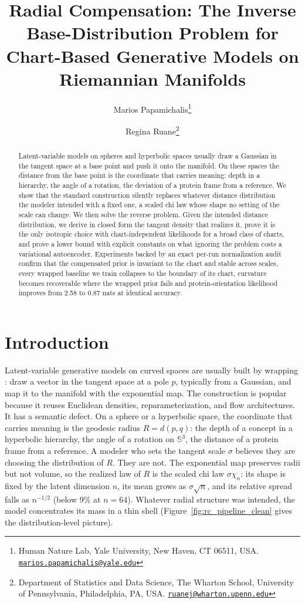 \documentclass{article}
\title{Radial Compensation: The Inverse Base-Distribution Problem for Chart-Based Generative Models on Riemannian Manifolds}
\author{Marios Papamichalis\thanks{\raggedright Human Nature Lab, Yale University, New Haven, CT 06511, USA. \href{mailto:marios.papamichalis@yale.edu}{\nolinkurl{marios.papamichalis@yale.edu}}}
\and Regina Ruane\thanks{\raggedright Department of Statistics and Data Science, The Wharton School, University of Pennsylvania, Philadelphia, PA, USA. \href{mailto:ruanej@wharton.upenn.edu}{\nolinkurl{ruanej@wharton.upenn.edu}}}}
\date{}
\theoremstyle{definition}
\theoremstyle{remark}
\newcommand{\SSS}{\mathbb{S}}
\begin{document}
\maketitle
\begin{abstract}
Latent-variable models on spheres and hyperbolic spaces usually draw a Gaussian in the tangent space at a base point and push it onto the manifold. On these spaces the distance from the base point is the coordinate that carries meaning: depth in a hierarchy, the angle of a rotation, the deviation of a protein frame from a reference. We show that the standard construction silently replaces whatever distance distribution the modeler intended with a fixed one, a scaled chi law whose shape no setting of the scale can change. We then solve the reverse problem. Given the intended distance distribution, we derive in closed form the tangent density that realizes it, prove it is the only isotropic choice with chart-independent likelihoods for a broad class of charts, and prove a lower bound with explicit constants on what ignoring the problem costs a variational autoencoder. Experiments backed by an exact per-run normalization audit confirm that the compensated prior is invariant to the chart and stable across scales, every wrapped baseline we train collapses to the boundary of its chart, curvature becomes recoverable where the wrapped prior fails and protein-orientation likelihood improves from 2.58 to 0.87 nats at identical accuracy.
\end{abstract}

\section{Introduction}
\label{sec:intro}

Latent-variable generative models on curved spaces are usually built by wrapping \citep{nagano2019wrapped,bose2020latent,skopek2019mixed,galaz2022wrapped}: draw a vector in the tangent space at a pole $p$, typically from a Gaussian, and map it to the manifold with the exponential map. The construction is popular because it reuses Euclidean densities, reparameterization, and flow architectures. It has a semantic defect. On a sphere or a hyperbolic space, the coordinate that carries meaning is the geodesic radius $R=d(p,q)$: the depth of a concept in a hyperbolic hierarchy, the angle of a rotation on $\SSS^3$, the distance of a protein frame from a reference. A modeler who sets the tangent scale $\sigma$ believes they are choosing the distribution of $R$. They are not. The exponential map preserves radii but not volume, so the realized law of $R$ is the scaled chi law $\sigma\chi_n$: its shape is fixed by the latent dimension $n$, its mean grows as $\sigma\sqrt n$, and its relative spread falls as $n^{-1/2}$ (below $9\%$ at $n=64$). Whatever radial structure was intended, the model concentrates its mass in a thin shell (Figure~\ref{fig:rc_pipeline_clean} gives the distribution-level picture).
\end{document}
